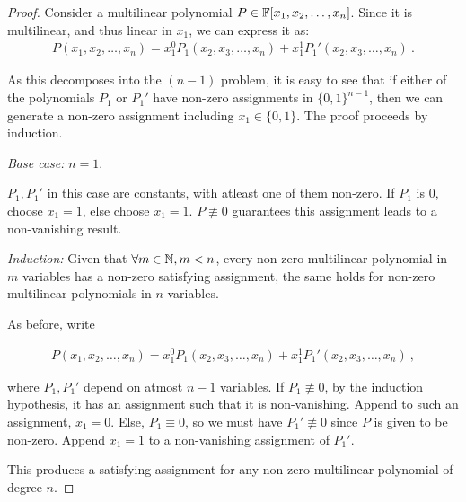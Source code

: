 \question

\begin{proof}
    Consider a multilinear polynomial \(P \in \mathbb{F}[x_1, x_2, \ldots, x_n]\).
    Since it is multilinear, and thus linear in \(x_1\), we can express it as:
    \begin{gather*}
        P(x_1, x_2, \ldots, x_n) = x_1^0P_1(x_2, x_3, \ldots, x_n) + x_1^1P_1'(x_2, x_3, \ldots, x_n)~.
    \end{gather*}

    As this decomposes into the \((n-1)\) problem, it is easy to see that if
    either of the polynomials \(P_1\) or \(P_1'\) have non-zero assignments in
    \(\{0, 1\}^{n-1}\), then we can generate a non-zero assignment including
    \(x_1 \in \{0, 1\}\). The proof proceeds by induction.

    \emph{Base case:} \(n=1\).

    \(P_1, P_1'\) in this case are constants, with atleast one of them non-zero.
    If \(P_1\) is \(0\), choose \(x_1 = 1\), else choose \(x_1 = 1\). \(P \not
    \equiv 0\) guarantees this assignment leads to a non-vanishing result.

    \emph{Induction:} Given that \(\forall m \in \mathbb{N}, m < n\), every non-zero
    multilinear polynomial in \(m\) variables has a non-zero satisfying
    assignment, the same holds for non-zero multilinear polynomials in \(n\)
    variables.
    
    As before, write 

    \begin{gather*}
        P(x_1, x_2, \ldots, x_n) = x_1^0P_1(x_2, x_3, \ldots, x_n) + x_1^1P_1'(x_2, x_3, \ldots, x_n)~,
    \end{gather*}

    where \(P_1, P_1'\) depend on atmost \(n-1\) variables. If \(P_1 \not \equiv
    0\), by the induction hypothesis, it has an assignment such that it is
    non-vanishing. Append to such an assignment, \(x_1 = 0\). Else, \(P_1 \equiv
    0\), so we must have \(P_1' \not \equiv 0\) since \(P\) is given to be
    non-zero. Append \(x_1 = 1\) to a non-vanishing assignment of \(P_1'\).

    This produces a satisfying assignment for any non-zero multilinear polynomial
    of degree \(n\).

\end{proof}
